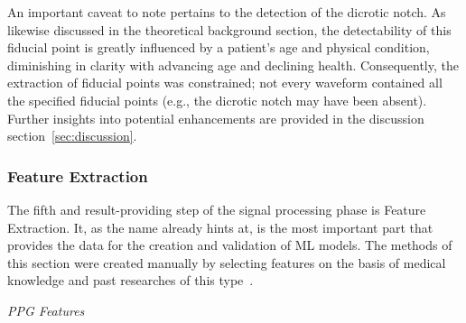 An important caveat to note pertains to the detection of the dicrotic notch.
As likewise discussed in the theoretical background section, the detectability of this fiducial point is greatly influenced by a patient's age and physical condition,
diminishing in clarity with advancing age and declining health.
Consequently, the extraction of fiducial points was constrained; not every waveform contained all the specified fiducial points (e.g., the dicrotic notch may have been absent).
Further insights into potential enhancements are provided in the discussion section~\ref{sec:discussion}.

\subsubsection{Feature Extraction}
\label{subsubsec:features}

The fifth and result-providing step of the signal processing phase is Feature Extraction.
It, as the name already hints at, is the most important part that provides the data for the creation and validation of ML models.
The methods of this section were created manually by selecting features on the basis of medical knowledge and past researches of this type~\cite{el-hajjDeepLearningModels2021, charltonAssessingHemodynamicsPhotoplethysmogram2022, maqsoodSurveyShallowDeep2022}.

\vspace{0.2cm}
\textit{PPG Features}
\vspace{0.2cm}

